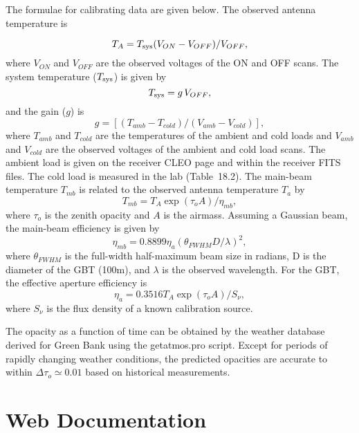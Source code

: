 The formulae for calibrating data are given below.  The observed
antenna temperature is

\begin{equation}
T_{A} = T_{\rm sys} (V_{ON} - V_{OFF})/V_{OFF},
\end{equation}
where  $V_{ON}$ and
$V_{OFF}$ are the observed voltages of the ON and OFF scans. 
The system temperature ($T_{\rm sys}$) is given by 
\begin{equation}
  T_{\rm sys} = g\,V_{OFF}, 
\end{equation}
and the gain ($g$) is
\begin{equation}
g = [(T_{amb}-T_{cold})/(V_{amb} - V_{cold})],
\end{equation}
where $T_{amb}$ and $T_{cold}$ are the temperatures of the ambient and
cold loads and $V_{amb}$ and $V_{cold}$ are the observed voltages of
the ambient and cold load scans.  The ambient load is given on the
receiver CLEO page and within the receiver FITS files.  The cold load
is measured in the lab (Table~18.2).  The main-beam temperature
$T_{mb}$ is related to the observed antenna temperature $T_{a}$ by
\begin{equation}
T_{mb} = T_{A} \exp(\tau_{o}A)/\eta_{mb},
\end{equation}
where $\tau_{o}$ is the zenith opacity and $A$ is the airmass.
Assuming a Gaussian beam, the main-beam efficiency is given by
\begin{equation}
\eta_{mb} = 0.8899\eta_{a}(\theta_{FWHM} D/\lambda)^2,
\end{equation}
where $\theta_{FWHM}$ is the full-width half-maximum beam size in
radians, D is the diameter of the GBT (100m), and $\lambda$ is the
observed wavelength. For the GBT, the effective aperture efficiency is
\begin{equation}
\eta_{a} = 0.3516 T_{A} \exp(\tau_{o}A)/S_{\nu}, 
\end{equation}
where $S_{\nu}$ is the flux density of a known calibration source.

The opacity as a function of time can be obtained by the weather
database derived for Green Bank using the getatmos.pro script.  Except
for periods of rapidly changing weather conditions, the predicted
opacities are accurate to within $\Delta \tau_o \simeq 0.01$ based on
historical measurements.



\section{Web Documentation}

